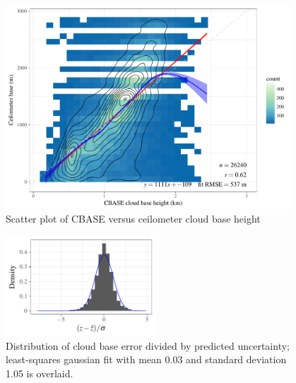 \documentclass[amt,manuscript]{copernicus}\usepackage[]{graphicx}\usepackage[]{color}
\newenvironment{knitrout}{}{} %
\begin{document}
\begin{figure}
  \centering
\begin{knitrout}
\color{fgcolor}

{\centering \includegraphics[width=0.95\textwidth]{figure/method-combo-plot-1} 

}



\end{knitrout}
  \caption{Scatter plot of CBASE versus ceilometer cloud base height}
  \label{fig:eval}
\end{figure}

\begin{figure}
  \centering
\begin{knitrout}
\color{fgcolor}

{\centering \includegraphics[width=0.5\textwidth]{figure/method-combo-eval-pull-1} 

}



\end{knitrout}
  \caption{Distribution of cloud base error divided by predicted uncertainty;
    least-squares gaussian fit with mean 0.03 and standard deviation 1.05 is overlaid.}
  \label{fig:pull}
\end{figure}
\end{document}
